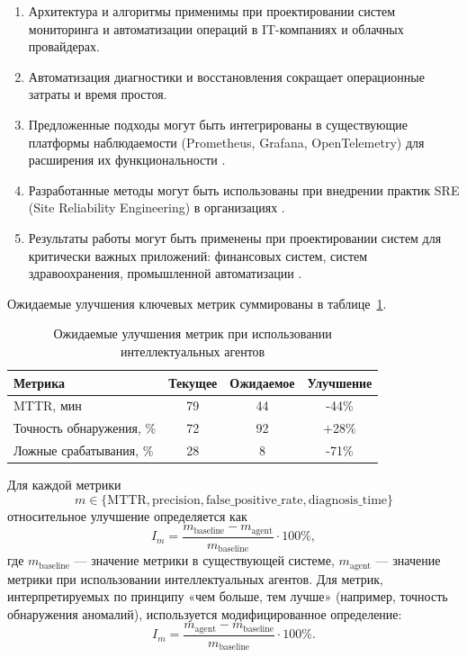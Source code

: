 \begin{enumerate}
    \item Архитектура и алгоритмы применимы при проектировании систем мониторинга и автоматизации операций в IT-компаниях и облачных провайдерах.

    \item Автоматизация диагностики и восстановления сокращает операционные затраты и время простоя.

    \item Предложенные подходы могут быть интегрированы в существующие платформы наблюдаемости (Prometheus, Grafana, OpenTelemetry) для расширения их функциональности \cite{prometheus_docs,grafana_docs,opentelemetry_docs}.

    \item Разработанные методы могут быть использованы при внедрении практик SRE (Site Reliability Engineering) в организациях \cite{google_sre_book,sre_principles}.

    \item Результаты работы могут быть применены при проектировании систем для критически важных приложений: финансовых систем, систем здравоохранения, промышленной автоматизации \cite{iso_25010,amazon_outage_cost}.
\end{enumerate}

Ожидаемые улучшения ключевых метрик суммированы в таблице~\ref{tab:expected_improvements}.

\begin{table}[H]
\centering
\caption{Ожидаемые улучшения метрик при использовании интеллектуальных агентов}
\label{tab:expected_improvements}
\begin{tabular}{|p{5cm}|c|c|c|}
\hline
\textbf{Метрика} & \textbf{Текущее} & \textbf{Ожидаемое} & \textbf{Улучшение} \\
\hline
MTTR, мин & 79 & 44 & -44\% \\
\hline
Точность обнаружения, \% & 72 & 92 & +28\% \\
\hline
Ложные срабатывания, \% & 28 & 8 & -71\% \\
\hline
\end{tabular}
\end{table}

Для каждой метрики
\[
  m \in \{
    \text{MTTR},
    \text{precision},
    \text{false\_positive\_rate},
    \text{diagnosis\_time}
  \}
\]
относительное улучшение определяется как
\begin{equation}
  I_m = \frac{m_{\text{baseline}} - m_{\text{agent}}}{m_{\text{baseline}}} \cdot 100\%,
\end{equation}
где \(m_{\text{baseline}}\) — значение метрики в существующей системе, \(m_{\text{agent}}\) — значение метрики при использовании интеллектуальных агентов. Для метрик, интерпретируемых по принципу «чем больше, тем лучше» (например, точность обнаружения аномалий), используется модифицированное определение:
\begin{equation}
  I_m = \frac{m_{\text{agent}} - m_{\text{baseline}}}{m_{\text{baseline}}} \cdot 100\%.
\end{equation}


